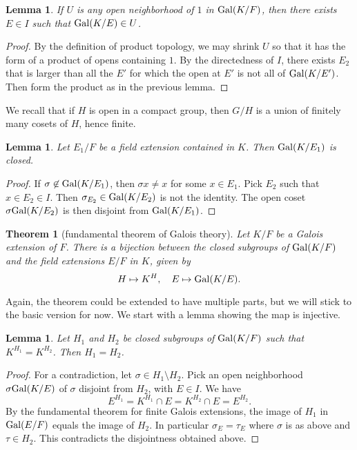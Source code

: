 \documentclass{amsart}
\newtheorem{theorem}[equation]{Theorem}
\newtheorem{lemma}[equation]{Lemma}
\begin{document}
\begin{lemma} If $U$ is any open neighborhood of $1$ in ${\operatorname{Gal}}(K/F)$, then
there exists $E\in I$ such that ${\operatorname{Gal}}(K/E)\in U$.
\end{lemma}

\begin{proof}  By the definition of product topology, we may shrink $U$ so that
it has the form of a product of opens containing $1$.  By the directedness of $I$,
there exists $E_2$ that is larger than all the $E'$ for which the open at $E'$ is not all
of ${\operatorname{Gal}}(K/E')$.  Then form the product as in the previous lemma.
\end{proof}

We recall that if $H$ is open in a compact group, then $G/H$ is a union of finitely
many cosets of $H$, hence finite.

\begin{lemma} Let $E_1/F$ be a field extension contained in $K$.  Then ${\operatorname{Gal}}(K/E_1)$
is closed.
\end{lemma}

\begin{proof}  If $\sigma\not\in {\operatorname{Gal}}(K/E_1)$, then $\sigma x\ne x$ for some
$x\in E_1$.  Pick $E_2$ such that $x\in E_2\in I$.  Then $\sigma_{E_2}\in{\operatorname{Gal}}(K/E_2)$
is not the identity.  The open coset $\sigma {\operatorname{Gal}}(K/E_2)$ is then disjoint
from ${\operatorname{Gal}}(K/E_1)$.
\end{proof}

\begin{theorem}[fundamental theorem of Galois theory] Let $K/F$ be a Galois
extension of $F$.  There is a bijection between the closed subgroups of ${\operatorname{Gal}}(K/F)$
and the field extensions $E/F$ in $K$, given by
\[
H \mapsto K^H,\quad E \mapsto {\operatorname{Gal}}(K/E).
\]
\end{theorem}

Again, the theorem could be extended to have multiple parts, but we will
stick to the basic version for now.
We start with a lemma showing the map is injective.

\begin{lemma}  Let $H_1$ and $H_2$ be closed subgroups of ${\operatorname{Gal}}(K/F)$
such that $K^{H_1}=K^{H_2}$.
Then $H_1 = H_2$.
\end{lemma}

\begin{proof} For a contradiction, let $\sigma\in H_1\setminus H_2$.
Pick an open neighborhood $\sigma {\operatorname{Gal}}(K/E)$ of $\sigma$ disjoint from $H_2$,
with $E\in I$.
We have
\[
E^{H_1} = K^{H_1}\cap E = K^{H_2}\cap E = E^{H_2}.
\]
By the fundamental theorem for finite Galois extensions, the image
of $H_1$ in ${\operatorname{Gal}}(E/F)$ equals the image of $H_2$.
In particular $\sigma_E = \tau_E$ where $\sigma$ is as above and $\tau\in H_2$.
This contradicts the disjointness obtained above.
\end{proof}
\end{document}
